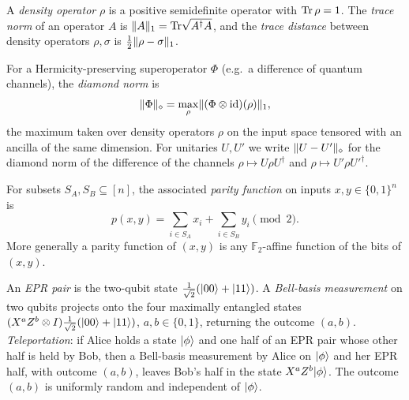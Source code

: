 \begin{definition}
  \label{def:trace-norm}
  A \emph{density operator} $\rho$ is a positive semidefinite operator with
  $\operatorname{Tr}\rho = 1$. The \emph{trace norm} of an operator $A$ is
  $\lVert A \rVert_{1} = \operatorname{Tr}\!\sqrt{A^\dagger A}$, and the \emph{trace distance} between
  density operators $\rho,\sigma$ is $\tfrac12\lVert \rho-\sigma \rVert_{1}$.
\end{definition}

\begin{definition}
  \label{def:diamond-norm}
  For a Hermicity-preserving superoperator $\Phi$ (e.g.\ a difference of quantum
  channels), the \emph{diamond norm} is
  \[
    \lVert \Phi \rVert_{\diamond}
      = \max_{\rho} \lVert (\Phi \otimes \mathrm{id})(\rho) \rVert_{1},
  \]
  the maximum taken over density operators $\rho$ on the input space tensored
  with an ancilla of the same dimension. For unitaries $U,U'$ we write
  $\lVert U-U' \rVert_{\diamond}$ for the diamond norm of the difference of the channels
  $\rho \mapsto U\rho U^\dagger$ and $\rho\mapsto U'\rho U'^\dagger$.
\end{definition}

\begin{definition}
  \label{def:parity}
  For subsets $S_A, S_B \subseteq [n]$, the associated \emph{parity function} on
  inputs $x,y \in \{0,1\}^n$ is
  \[
    p(x,y) = \sum_{i \in S_A} x_i + \sum_{i \in S_B} y_i \pmod 2 .
  \]
  More generally a parity function of $(x,y)$ is any $\mathbb{F}_2$-affine
  function of the bits of $(x,y)$.
\end{definition}

\begin{definition}
  \label{def:teleportation}
  An \emph{EPR pair} is the two-qubit state
  $\tfrac{1}{\sqrt2}(\lvert 00\rangle+\lvert 11\rangle)$. A \emph{Bell-basis measurement} on two
  qubits projects onto the four maximally entangled states
  $(X^a Z^b \otimes I)\tfrac{1}{\sqrt2}(\lvert 00\rangle+\lvert 11\rangle)$, $a,b\in\{0,1\}$,
  returning the outcome $(a,b)$. \emph{Teleportation}: if Alice holds a state
  $\lvert \phi\rangle$ and one half of an EPR pair whose other half is held by Bob, then
  a Bell-basis measurement by Alice on $\lvert \phi\rangle$ and her EPR half, with
  outcome $(a,b)$, leaves Bob's half in the state $X^a Z^b \lvert \phi\rangle$. The
  outcome $(a,b)$ is uniformly random and independent of $\lvert \phi\rangle$.
\end{definition}

